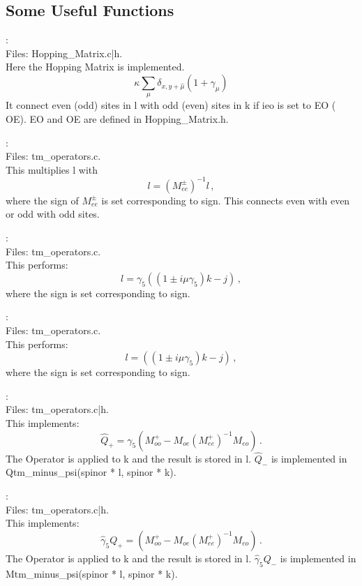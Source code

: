 \subsection{Some Useful Functions}

:\\
Files: {\ttfamily Hopping\_Matrix.c|h}.\\
Here the Hopping Matrix is implemented.
\[
\kappa\sum_\mu \delta_{x,y+\hat\mu}(1+\gamma_\mu)
\]
It connect even (odd) sites in {\ttfamily l} with odd  (even) sites in {\ttfamily k}
if {\ttfamily ieo} is set to {\ttfamily EO} ({\ttfamily
  OE}). {\ttfamily EO} and {\ttfamily OE} are defined in {\ttfamily
  Hopping\_Matrix.h}.

:\\
Files: {\ttfamily tm\_operators.c}.\\
This multiplies {\ttfamily l} with 
\[
l = (M_{ee}^{\pm})^{-1} l\, ,
\]
where the sign of $M_{ee}^{\pm}$ is set corresponding to {\ttfamily
  sign}. This connects even with even or odd with odd sites.

:\\
Files: {\ttfamily tm\_operators.c}.\\
This performs:
\[
l = \gamma_5 ((1 \pm i \mu \gamma_5)k - j)\, ,
\]
where the sign is set corresponding to {\ttfamily sign}.

:\\
Files: {\ttfamily tm\_operators.c}.\\
This performs:
\[
l = ((1 \pm i \mu \gamma_5)k - j)\, ,
\]
where the sign is set corresponding to {\ttfamily sign}.

:\\
Files: {\ttfamily tm\_operators.c|h}.\\
This implements:
\[
\hat Q_{+} = \gamma_5(M_{oo}^+ - M_{oe}(M_{ee}^+ )^{-1}M_{eo})\, .
\]
The Operator is applied to {\ttfamily k} and the result is stored in
{\ttfamily l}. $\hat Q_{-}$ is implemented in {\ttfamily
  Qtm\_minus\_psi(spinor * l, spinor * k)}.

:\\
Files: {\ttfamily tm\_operators.c|h}.\\
This implements:
\[
\hat \gamma_5Q_{+} = (M_{oo}^+ - M_{oe}(M_{ee}^+ )^{-1}M_{eo})\, .
\]
The Operator is applied to {\ttfamily k} and the result is stored in
{\ttfamily l}. $\hat \gamma_5Q_{-}$ is implemented in {\ttfamily
  Mtm\_minus\_psi(spinor * l, spinor * k)}.

